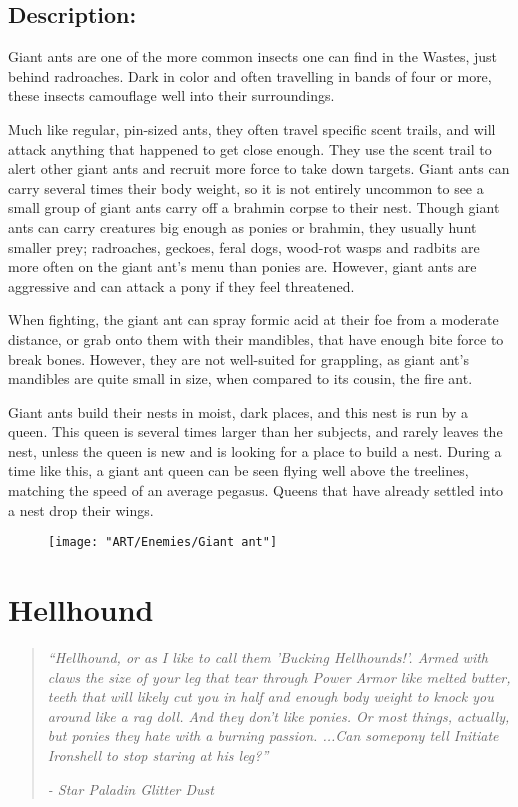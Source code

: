 \documentclass[11pt,a4paper,twocolumn]{book}
\begin{document}
	
	\subsection*{Description:}
	Giant ants are one of the more common insects one can find in the Wastes, just behind radroaches. Dark in color and often travelling in bands of four or more, these insects camouflage well into their surroundings. 
	
	Much like regular, pin-sized ants, they often travel specific scent trails, and will attack anything that happened to get close enough. They use the scent trail to alert other giant ants and recruit more force to take down targets. Giant ants can carry several times their body weight, so it is not entirely uncommon to see a small group of giant ants carry off a brahmin corpse to their nest.
	Though giant ants can carry creatures big enough as ponies or brahmin, they usually hunt smaller prey; radroaches, geckoes, feral dogs, wood-rot wasps and radbits are more often on the giant ant's menu than ponies are. However, giant ants are aggressive and can attack a pony if they feel threatened.
	
	When fighting, the giant ant can spray formic acid at their foe from a moderate distance, or grab onto them with their mandibles, that have enough bite force to break bones. However, they are not well-suited for grappling, as giant ant's mandibles are quite small in size, when compared to its cousin, the fire ant.
	
	Giant ants build their nests in moist, dark places, and this nest is run by a queen. This queen is several times larger than her subjects, and rarely leaves the nest, unless the queen is new and is looking for a place to build a nest. During a time like this, a giant ant queen can be seen flying well above the treelines, matching the speed of an average pegasus. Queens that have already settled into a nest drop their wings.
	
	\begin{figure}
		\centering
		\texttt{[image: "ART/Enemies/Giant ant"]}
	\end{figure}
	
	\clearpage
	
	\section*{Hellhound}
	\begin{quote}
		\emph{``Hellhound, or as I like to call them 'Bucking Hellhounds!'. Armed with claws the size of your leg that tear through Power Armor like melted butter, teeth that will likely cut you in half and enough body weight to knock you around like a rag doll. And they don't like ponies. Or most things, actually, but ponies they hate with a burning passion. ...Can somepony tell Initiate Ironshell to stop staring at his leg?''}
		
		\emph{-	Star Paladin Glitter Dust}
	\end{quote}
	
\end{document}
